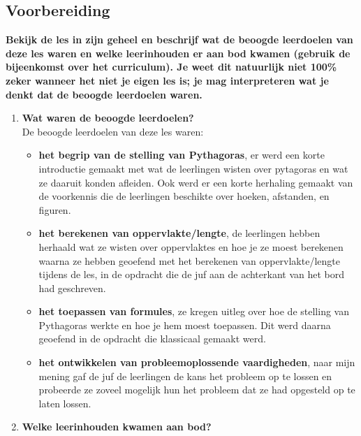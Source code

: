 \documentclass{article}
\begin{document}
        \subsection{Voorbereiding}
            \textbf{Bekijk de les in zijn geheel en beschrijf wat de beoogde leerdoelen van deze les waren en welke leerinhouden er aan bod kwamen (gebruik de bijeenkomst over het curriculum). Je weet dit natuurlijk niet 100\% zeker wanneer het niet je eigen les is; je mag interpreteren wat je denkt dat de beoogde leerdoelen waren.}
            \begin{enumerate}[label=(\alph*)]
                \item \textbf{Wat waren de beoogde leerdoelen?} \\

                    De beoogde leerdoelen van deze les waren:
                    \begin{itemize}
                        \item \textbf{het begrip van de stelling van Pythagoras}, er werd een korte introductie gemaakt met wat de leerlingen wisten over pytagoras en wat ze daaruit konden afleiden. Ook werd er een korte herhaling gemaakt van de voorkennis die de leerlingen beschikte over hoeken, afstanden, en figuren.
                        \item \textbf{het berekenen van oppervlakte/lengte}, de leerlingen hebben herhaald wat ze wisten over oppervlaktes en hoe je ze moest berekenen waarna ze hebben geoefend met het berekenen van oppervlakte/lengte tijdens de les, in de opdracht die de juf aan de achterkant van het bord had geschreven.
                        \item \textbf{het toepassen van formules}, ze kregen uitleg over hoe de stelling van Pythagoras werkte en hoe je hem moest toepassen. Dit werd daarna geoefend in de opdracht die klassicaal gemaakt werd.                        
                        \item \textbf{het ontwikkelen van probleemoplossende vaardigheden}, naar mijn mening gaf de juf de leerlingen de kans het probleem op te lossen en probeerde ze zoveel mogelijk hun het probleem dat ze had opgesteld op te laten lossen.
                    \end{itemize}
                     
                \item \textbf{Welke leerinhouden kwamen aan bod?} \\


\end{enumerate}
\end{document}

